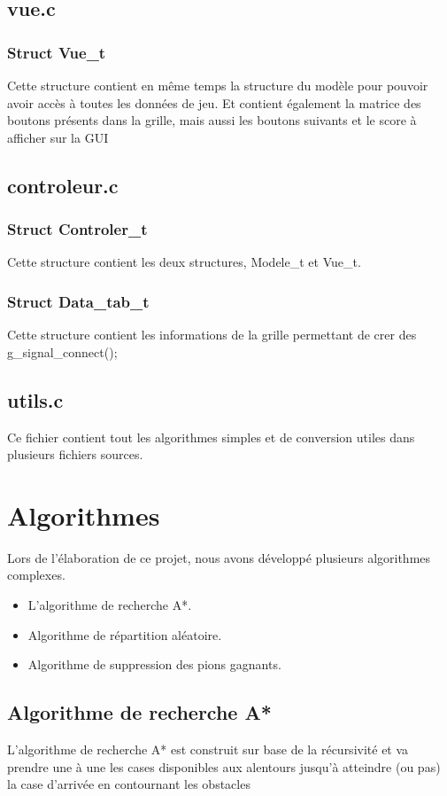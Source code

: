 \documentclass[a4paper, 11pt, oneside]{article}
\begin{document}
\subsection{vue.c}
\subsubsection{Struct Vue\_t}
Cette structure contient en même temps la structure du modèle pour pouvoir avoir accès à toutes les données de jeu. Et contient également la matrice des boutons présents dans la grille, mais aussi les boutons suivants et le score à afficher sur la GUI
\subsection{controleur.c}
\subsubsection{Struct Controler\_t}
Cette structure contient les deux structures, Modele\_t et Vue\_t.
\subsubsection{Struct Data\_tab\_t}
Cette structure contient les informations de la grille permettant de crer des g\_signal\_connect();
\subsection{utils.c}
Ce fichier contient tout les algorithmes simples et de conversion utiles dans plusieurs fichiers sources.

\section{Algorithmes}
Lors de l'élaboration de ce projet, nous avons développé plusieurs algorithmes complexes.
\begin{itemize}
    \item L'algorithme de recherche A*.
    \item Algorithme de répartition aléatoire.
    \item Algorithme de suppression des pions gagnants.
\end{itemize}
\subsection{Algorithme de recherche A*}
L'algorithme de recherche A* est construit sur base de la récursivité et va prendre une à une les cases disponibles aux alentours jusqu'à atteindre (ou pas) la case d'arrivée en contournant les obstacles
\end{document}
